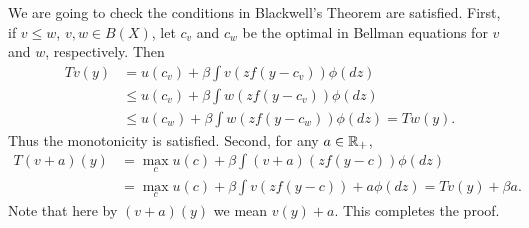 \documentclass[12pt]{article}
\begin{document}
\begin{sol}[1.2]
    We are going to check the conditions in Blackwell's Theorem are 
    satisfied. First, if $v\leq w$, $v,w\in B(X)$, let $c_v$ and 
    $c_w$ be the optimal in Bellman equations for $v$ and $w$, respectively. 
    Then 
    \begin{equation*}
        \begin{aligned}
            Tv(y) 
            &= u(c_v) + \beta\int v(zf(y-c_v))\phi(dz)\\
            &\leq u(c_v) + \beta\int w(zf(y-c_v))\phi(dz)\\
            &\leq u(c_w) + \beta\int w(zf(y-c_w))\phi(dz) = Tw(y).
        \end{aligned}
    \end{equation*} 
    Thus the monotonicity is satisfied. Second, for any $a\in\mathbb{R}_+$, 
    \begin{equation*}
        \begin{aligned}
            T(v+a)(y) 
            &= \max_c u(c) + \beta\int (v+a)(zf(y-c))\phi(dz)\\
            &= \max_c u(c) + \beta\int v(zf(y-c))+a \phi(dz)
            = Tv(y) + \beta a.
        \end{aligned}
    \end{equation*}
    Note that here by $(v+a)(y)$ we mean $v(y) + a$. This completes 
    the proof.
    \solend
\end{sol}
\end{document}
